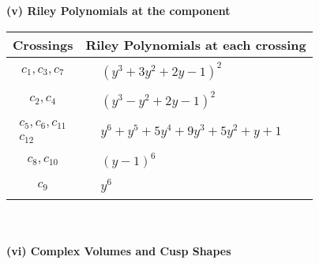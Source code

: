 \documentclass[1p]{elsarticle_modified}
\theoremstyle{definition}
\begin{document}
\newpage\renewcommand{\arraystretch}{1}
\flushleft \textbf{(v) Riley Polynomials at the component}\newline \\
\begin{tabular}{m{50pt}|m{274pt}}
Crossings & \hspace{64pt}Riley Polynomials at each crossing \\
\hline $$\begin{aligned}c_{1},c_{3},c_{7}\end{aligned}$$&$\begin{aligned}
&(y^3+3 y^2+2 y-1)^2
\end{aligned}$\\
\hline $$\begin{aligned}c_{2},c_{4}\end{aligned}$$&$\begin{aligned}
&(y^3- y^2+2 y-1)^2
\end{aligned}$\\
\hline $$\begin{aligned}c_{5},c_{6},c_{11}\\c_{12}\end{aligned}$$&$\begin{aligned}
&y^6+y^5+5 y^4+9 y^3+5 y^2+y+1
\end{aligned}$\\
\hline $$\begin{aligned}c_{8},c_{10}\end{aligned}$$&$\begin{aligned}
&(y-1)^6
\end{aligned}$\\
\hline $$\begin{aligned}c_{9}\end{aligned}$$&$\begin{aligned}
&y^6
\end{aligned}$\\
\hline
\end{tabular}\\~\\
\newpage\flushleft \textbf{(vi) Complex Volumes and Cusp Shapes}
\end{document}
